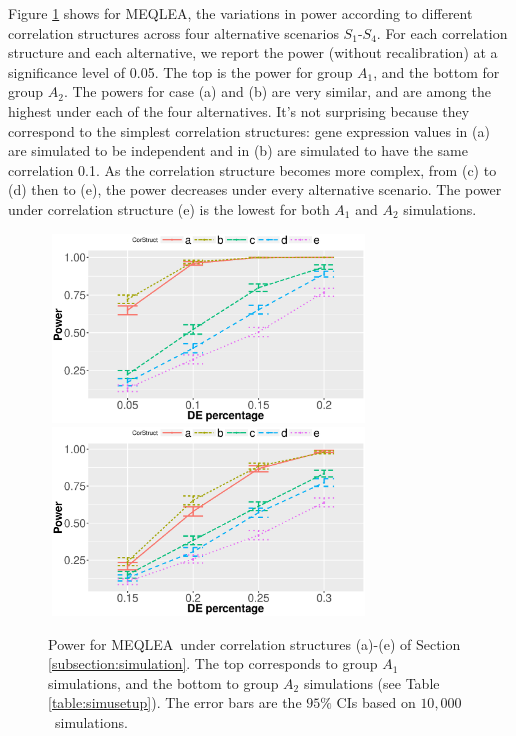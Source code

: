 \documentclass[a4,center,fleqn]{NAR}
\newcommand{\OurMethod}{MEQLEA}
\newcommand{\aaCase}{a}
\newcommand{\aCase}{c}
\newcommand{\cCase}{b}
\newcommand{\eCase}{d}
\newcommand{\fCase}{e}
\newcommand{\HowmanySimu}{$10,000$}
\begin{document}
	Figure \ref{fig:power} shows for \OurMethod, the variations in power according to different
	correlation structures across four alternative scenarios $S_1$-$S_4$. For each correlation structure
	and each alternative, we report the power (without recalibration) at a significance level of 0.05.
	The top is the power for group $A_1$, and the bottom for group $A_2$.  The powers for case (\aaCase)
	and (\cCase) are very similar, and are among the highest under each of the four alternatives. It's
	not surprising because they correspond to the simplest correlation structures: gene expression
	values in (\aaCase) are simulated to be independent and in (\cCase) are simulated to have the same
	correlation 0.1. As the correlation structure becomes more complex, from (\aCase) to (\eCase) then
	to (\fCase), the power decreases under every alternative scenario. The power under correlation
	structure (\fCase) is the lowest for both $A_1$ and $A_2$ simulations.%
	
	\begin{figure}
		\begin{center}
			\includegraphics[width=8.5cm,height=5cm]{Figures/powerA1pct.eps}
			\includegraphics[width=8.5cm,height=5cm]{Figures/powerA2pct.eps}
		\end{center} 
		\caption{Power for \OurMethod~under correlation structures (\aaCase)-(\fCase) of Section
			\ref{subsection:simulation}. The top corresponds to group $A_1$ simulations, and the bottom to group
			$A_2$ simulations (see Table \ref{table:simusetup}). The error bars are the $95\%$ CIs based on
			\HowmanySimu~simulations. }\label{fig:power}
	\end{figure} 
	
\end{document}
